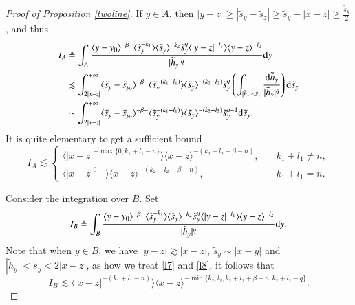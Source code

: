 \documentclass[11pt,reqno]{amsart}
\def\d{{\rm d}}
\numberwithin{equation}{section}
\theoremstyle{definition}
\begin{document}
\begin{appendix}
\begin{proof}[Proof of Proposition \ref{twoline}]
		If $y\in A$, then $|y-z|\geq|\tilde{s}_y-\tilde{s}_z|\geq\tilde{s}_y-|x-z|\geq\frac{\tilde{s}_y}{2}$, and thus
		\begin{equation*}
			\begin{split}
				I_A&\triangleq\int_A\frac{\langle y-y_0\rangle^{-\beta-}\langle\tilde{s}_y^{-k_1}\rangle\langle\tilde{s}_y\rangle^{-k_2}\tilde{s}_y^q\langle|y-z|^{-l_1}\rangle\langle y-z\rangle^{-l_2}}{|\tilde{h}_y|^q}\d y\\
				&\lesssim\int_{2|x-z|}^{+\infty}\langle\tilde{s}_y-\tilde{s}_{y_0}\rangle^{-\beta-}\langle\tilde{s}_y^{-(k_1+l_1)}\rangle\langle\tilde{s}_y\rangle^{-(k_2+l_2)}\tilde{s}_y^q\left(\int_{|\tilde{h}_y|<\tilde{s}_y}\frac{\d\tilde{h}_y}{|\tilde{h}_y|^q}\right)\d\tilde{s}_y\\
				&\sim\int_{2|x-z|}^{+\infty}\langle\tilde{s}_y-\tilde{s}_{y_0}\rangle^{-\beta-}\langle\tilde{s}_y^{-(k_1+l_1)}\rangle\langle\tilde{s}_y\rangle^{-(k_2+l_2)}\tilde{s}_y^{n-1}\d\tilde{s}_y.
			\end{split}
		\end{equation*}
		It is quite elementary to get a sufficient bound
		\begin{equation*}
			I_A\lesssim\begin{cases}
				\langle|x-z|^{-\max\{0,k_1+l_1-n\}}\rangle\langle x-z\rangle^{-(k_2+l_2+\beta-n)},\quad&k_1+l_1\neq n,\\
				\langle|x-z|^{0-}\rangle\langle x-z\rangle^{-(k_2+l_2+\beta-n)},\quad&k_1+l_1=n.
			\end{cases}
		\end{equation*}
		
		Consider the integration over $B$. Set
		\begin{equation*}
			I_B\triangleq\int_B\frac{\langle y-y_0\rangle^{-\beta-}\langle\tilde{s}_y^{-k_1}\rangle\langle\tilde{s}_y\rangle^{-k_2}\tilde{s}_y^q\langle|y-z|^{-l_1}\rangle\langle y-z\rangle^{-l_2}}{|\tilde{h}_y|^q}\d y.
		\end{equation*}
		Note that when $y\in B$, we have $|y-z|\gtrsim|x-z|$, $\tilde{s}_y\sim|x-y|$ and $|\tilde{h}_y|<\tilde{s}_y<2|x-z|$, as how we treat \eqref{l7} and \eqref{l8}, it follows that
		\begin{equation*}\label{l22}
			I_B\lesssim\langle|x-z|^{-(k_1+l_1-n)}\rangle\langle x-z\rangle^{-\min\{k_2,l_2,k_2+l_2+\beta-n,k_2+l_2-q\}}.
		\end{equation*}
		

\end{proof}
\end{appendix}
\end{document}

